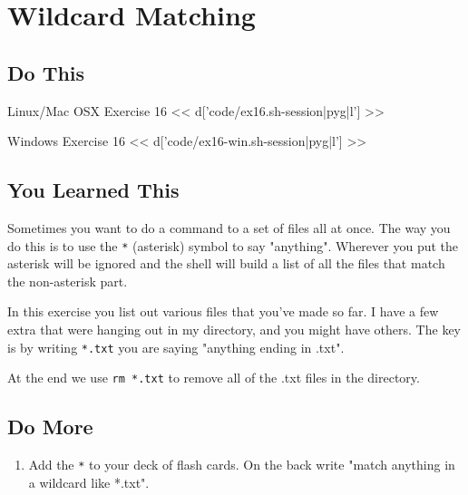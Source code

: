 \chapter{Wildcard Matching}

\section{Do This}

\begin{code}{Linux/Mac OSX Exercise 16}
<< d['code/ex16.sh-session|pyg|l'] >>
\end{code}

\begin{code}{Windows Exercise 16}
<< d['code/ex16-win.sh-session|pyg|l'] >>
\end{code}

\section{You Learned This}

Sometimes you want to do a command to a set of files all at once.  The way you do
this is to use the \verb|*| (asterisk) symbol to say "anything".  Wherever you
put the asterisk will be ignored and the shell will build a list of all the files
that match the non-asterisk part.

In this exercise you list out various files that you've made so far.  I have a
few extra that were hanging out in my directory, and you might have others.  The
key is by writing \verb|*.txt| you are saying "anything ending in .txt".

At the end we use \verb|rm *.txt| to remove all of the .txt files in the
 directory.

\section{Do More}

\begin{enumerate}
\item Add the \verb|*| to your deck of flash cards.  On the back write "match anything in a wildcard like *.txt".
\end{enumerate}

